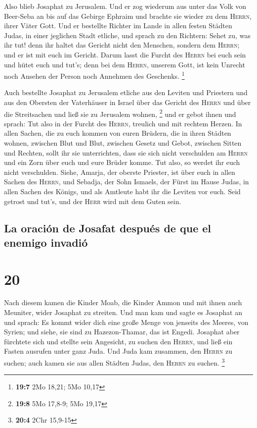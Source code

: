  Also blieb Josaphat zu Jerusalem. Und er zog wiederum aus
unter das Volk von Beer-Seba an bis auf das Gebirge Ephraim und brachte
sie wieder zu dem \textsc{Herrn}, ihrer Väter Gott.  Und
er bestellte Richter im Lande in allen festen Städten Judas, in einer
jeglichen Stadt etliche,  und sprach zu den Richtern:
Sehet zu, was ihr tut! denn ihr haltet das Gericht nicht den Menschen,
sondern dem \textsc{Herrn}; und er ist mit euch im Gericht.
 Darum lasst die Furcht des \textsc{Herrn} bei euch sein
und hütet euch und tut's; denn bei dem \textsc{Herrn}, unserem Gott, ist
kein Unrecht noch Ansehen der Person noch Annehmen des Geschenks.
\footnote{\textbf{19:7} 2Mo 18,21; 5Mo 10,17}

 Auch bestellte Josaphat zu Jerusalem etliche aus den
Leviten und Priestern und aus den Obersten der Vaterhäuser in Israel
über das Gericht des \textsc{Herrn} und über die Streitsachen und ließ
sie zu Jerusalem wohnen, \footnote{\textbf{19:8} 5Mo 17,8-9; 5Mo 19,17}
 und er gebot ihnen und sprach: Tut also in der Furcht des
\textsc{Herrn}, treulich und mit rechtem Herzen.  In
allen Sachen, die zu euch kommen von euren Brüdern, die in ihren Städten
wohnen, zwischen Blut und Blut, zwischen Gesetz und Gebot, zwischen
Sitten und Rechten, sollt ihr sie unterrichten, dass sie sich nicht
verschulden am \textsc{Herrn} und ein Zorn über euch und eure Brüder
komme. Tut also, so werdet ihr euch nicht verschulden. 
Siehe, Amarja, der oberste Priester, ist über euch in allen Sachen des
\textsc{Herrn}, und Sebadja, der Sohn Ismaels, der Fürst im Hause Judas,
in allen Sachen des Königs, und als Amtleute habt ihr die Leviten vor
euch. Seid getrost und tut's, und der \textsc{Herr} wird mit dem Guten
sein.

\hypertarget{la-oraciuxf3n-de-josafat-despuuxe9s-de-que-el-enemigo-invadiuxf3}{%
\subsection{La oración de Josafat después de que el enemigo
invadió}\label{la-oraciuxf3n-de-josafat-despuuxe9s-de-que-el-enemigo-invadiuxf3}}

\hypertarget{section-19}{%
\section{20}\label{section-19}}

 Nach diesem kamen die Kinder Moab, die Kinder Ammon und
mit ihnen auch Meuniter, wider Josaphat zu streiten.  Und
man kam und sagte es Josaphat an und sprach: Es kommt wider dich eine
große Menge von jenseits des Meeres, von Syrien; und siehe, sie sind zu
Hazezon-Thamar, das ist Engedi.  Josaphat aber fürchtete
sich und stellte sein Angesicht, zu suchen den \textsc{Herrn}, und ließ
ein Fasten ausrufen unter ganz Juda.  Und Juda kam
zusammen, den \textsc{Herrn} zu suchen; auch kamen sie aus allen Städten
Judas, den \textsc{Herrn} zu suchen. \footnote{\textbf{20:4} 2Chr
  15,9-15}

